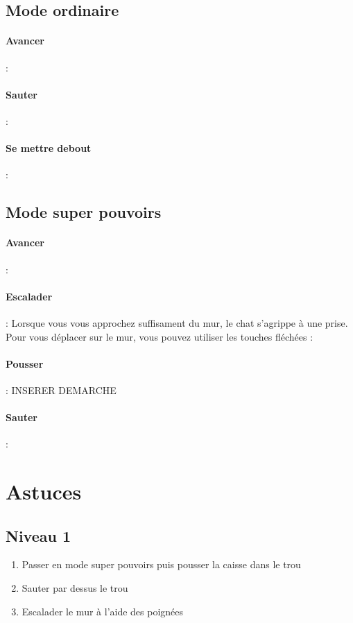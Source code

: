 \documentclass[a4paper,11pt]{article}
\begin{document}
\subsection{Mode ordinaire}
\paragraph{Avancer }: \fbox{$\rightarrow$}

\paragraph{Sauter} : 

\paragraph{Se mettre debout} : 
\subsection{Mode super pouvoirs}
\paragraph{Avancer} : \fbox{$\rightarrow$}

\paragraph{Escalader} : Lorsque vous vous approchez suffisament du mur, le chat s'agrippe à une prise. Pour vous déplacer sur le mur, vous pouvez utiliser les touches fléchées : \fbox{$\uparrow$} \fbox{$\rightarrow$} \fbox{$\downarrow$} \fbox{$\leftarrow$}

\paragraph{Pousser} : INSERER DEMARCHE 

\paragraph{Sauter} : 



\section{Astuces}
\subsection{Niveau 1}
\begin{enumerate}
\item Passer en mode super pouvoirs puis pousser la caisse dans le trou
\item Sauter par dessus le trou
\item Escalader le mur à l'aide des poignées
\end{enumerate}
\end{document}
